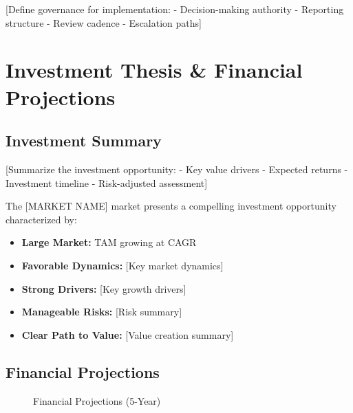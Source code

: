 \documentclass[11pt,letterpaper]{report}
\newcommand{\reporttitle}{[MARKET NAME]}
\begin{document}
[Define governance for implementation:
- Decision-making authority
- Reporting structure
- Review cadence
- Escalation paths]

\chapter{Investment Thesis \& Financial Projections}

\section{Investment Summary}

[Summarize the investment opportunity:
- Key value drivers
- Expected returns
- Investment timeline
- Risk-adjusted assessment]

\begin{executivesummarybox}
The \reporttitle{} market presents a compelling investment opportunity characterized by:

\begin{itemize}
    \item \textbf{Large Market:}  TAM growing at  CAGR
    \item \textbf{Favorable Dynamics:} [Key market dynamics]
    \item \textbf{Strong Drivers:} [Key growth drivers]
    \item \textbf{Manageable Risks:} [Risk summary]
    \item \textbf{Clear Path to Value:} [Value creation summary]
\end{itemize}
\end{executivesummarybox}

\section{Financial Projections}


\begin{figure}[htbp]
\centering
\caption{Financial Projections (5-Year)}
\label{fig:financials}
\end{figure}
\end{document}
